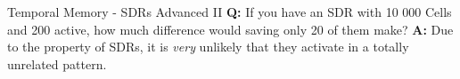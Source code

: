 \begin{frame}[c]{Temporal Memory - SDRs Advanced II}
    \Large
    \textbf{Q:} If you have an SDR with 10 000 Cells and 200 active, how much difference would saving only 20 of them make?
    \newline
    \pause
    \newline
    \textbf{A:} Due to the property of SDRs, it is {\em very} unlikely that they activate in a totally unrelated pattern.
\end{frame}






















%
%
%
%
%
%
%
%
%
%




